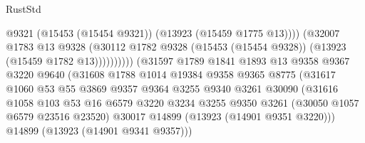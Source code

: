 \begin{lexlean}{RustStd}
\begin{coremodule}
                                              @9321
                                              (@15453 (@15454 @9321))
                                              (@13923 (@15459 @1775 @13))))
                                          (@32007
                                            @1783
                                            @13
                                            @9328
                                            (@30112
                                              @1782
                                              @9328
                                              (@15453 (@15454 @9328))
                                              (@13923 (@15459 @1782 @13))))))))))
                              (@31597
                                @1789
                                @1841
                                @1893
                                @13
                                @9358
                                @9367
                                @3220
                                @9640
                                (@31608
                                  @1788
                                  @1014
                                  @19384
                                  @9358
                                  @9365
                                  @8775
                                  (@31617
                                    @1060
                                    @53
                                    @55
                                    @3869
                                    @9357
                                    @9364
                                    @3255
                                    @9340
                                    @3261
                                    @30090
                                    (@31616
                                      @1058
                                      @103
                                      @53
                                      @16
                                      @6579
                                      @3220
                                      @3234
                                      @3255
                                      @9350
                                      @3261
                                      (@30050 @1057 @6579 @23516 @23520)
                                      @30017
                                      @14899
                                      (@13923 (@14901 @9351 @3220)))
                                    @14899
                                    (@13923 (@14901 @9341 @9357)))

\end{coremodule}
\end{lexlean}
